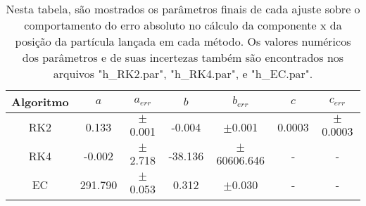 \documentclass[a4paper, brazilian, 8pt, final]{article}
\begin{document}
\begin{table}[!h]
\centering
\begin{tabular}{c|c|c|c|c|c|c}
\hline
\hline
Algoritmo & $a$ & $a_{err}$ & $b$ & $b_{err}$ & $c$ & $c_{err}$\\
\hline
\hline
RK2 & 0.133 & $\pm$0.001 & -0.004 & $\pm$0.001 & 0.0003 & $\pm$0.0003\\
RK4 & -0.002 & $\pm$2.718 & -38.136 & $\pm$60606.646 & - & -\\
EC & 291.790 & $\pm$0.053 & 0.312 & $\pm$0.030 & - & -\\ 
\hline
\hline
\end{tabular}
\caption{Nesta tabela, são mostrados os parâmetros finais de cada ajuste sobre o comportamento do erro absoluto no cálculo da componente x da posição da partícula lançada em cada método. Os valores numéricos dos parâmetros e de suas incertezas também são encontrados nos arquivos "h\_RK2.par", "h\_RK4.par", e "h\_EC.par".}
\end{table}

\newpage
\end{document}
